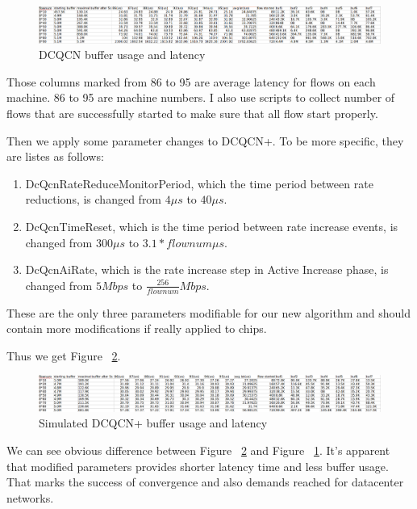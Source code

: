 \documentclass[12pt,a4paper]{article}
\begin{document}
\begin{figure}[ht]
	\begin{center}
		\includegraphics[width=6in]{default}
		\caption{DCQCN buffer usage and latency}
		\label{fig:default}
	\end{center}
\end{figure}

Those columns marked from 86 to 95 are average latency for flows on each machine.
86 to 95 are machine numbers.
I also use scripts to collect number of flows that are successfully started to make sure that all flow start properly.

Then we apply some parameter changes to DCQCN+. To be more specific, they are listes as follows:
\begin{enumerate}
	\item DcQcnRateReduceMonitorPeriod, which the time period between rate reductions, is changed from $4\mu s$ to $40\mu s$.
	\item DcQcnTimeReset, which is the time period between rate increase events, is changed from $300\mu s$ to $3.1*flownum \mu s$.
	\item DcQcnAiRate, which is the rate increase step in Active Increase phase, is changed from $5Mbps$ to $\frac{256}{flownum} Mbps$.
\end{enumerate}
These are the only three parameters modifiable for our new algorithm and should contain more modifications if really applied to chips.

Thus we get Figure ~\ref{fig:improved}.

\begin{figure}[ht]
	\begin{center}
		\includegraphics[width=6in]{improved}
		\caption{Simulated DCQCN+ buffer usage and latency}
		\label{fig:improved}
	\end{center}
\end{figure}

We can see obvious difference between Figure ~\ref{fig:improved} and Figure ~\ref{fig:default}.
It's apparent that modified parameters provides shorter latency time and less buffer usage.
That marks the success of convergence and also demands reached for datacenter networks.
\end{document}
